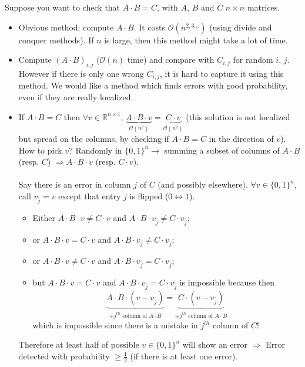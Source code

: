 \documentclass[11pt,a4paper]{scrartcl} %
\theoremstyle{definition}
\newcommand{\R}{\mathbb{R}}
\begin{document}
Suppose you want to check that $A\cdot B=C$, with $A$, $B$ and $C$ $n\times n$ matrices.
\begin{itemize}
	\item Obvious method: compute $A\cdot B$. It costs $\mathcal{O}(n^{2,3\hdots})$ (using divide and conquer methods). If $n$ is large, then this method might take a lot of time.
	\item Compute $\left( A\cdot B\right)_{i,j}$ ($\mathcal{O}(n)$ time) and compare with $C_{i,j}$ for random $i$, $j$. However if there is only one wrong $C_{i,j}$, it is hard to capture it using this method. We would like a method which finds errors with good probability, even if they are really localized.
	\item If $A\cdot B=C$ then $\forall v\in \R^{n\times 1}$, $\underbrace{A\cdot B\cdot v}_{\mathcal{O}(n^2)}=\underbrace{C\cdot v}_{\mathcal{O}(n^2)}$ (this solution is not localized but spread on the columns, by checking if $A\cdot B=C$ in the direction of $v$). How to pick $v$? Randomly in $\{0,1\}^n\rightarrow$ summing a subset of columns of $A\cdot B$ (resp. $C$) $\Rightarrow A\cdot B \cdot v$ (resp. $C\cdot v$).
	
	\paragraph{}
	
	Say there is an error in column $j$ of $C$ (and possibly elsewhere). $\forall v\in \{0,1\}^n$, call $v_{\bar{j}}=v$ except that entry $j$ is flipped ($0 \leftrightarrow 1$). 
	\begin{itemize}
		\item Either $A\cdot B\cdot v\neq C\cdot v$ and $A\cdot B\cdot v_{\bar{j}}\neq C\cdot v_{\bar{j}}$;
		\item or $A\cdot B\cdot v= C\cdot v$ and $A\cdot B\cdot v_{\bar{j}}\neq C\cdot v_{\bar{j}}$;
		\item or $A\cdot B\cdot v\neq C\cdot v$ and $A\cdot B\cdot v_{\bar{j}}= C\cdot v_{\bar{j}}$;
		\item but $A\cdot B\cdot v= C\cdot v$ and $A\cdot B\cdot v_{\bar{j}}= C\cdot v_{\bar{j}}$ is impossible because then 
		$$\underbrace{A\cdot B \cdot (v-v_{\bar{j}})}_{\pm j^{th} \text{ column of } A\cdot B}=\underbrace{C\cdot (v-v_{\bar{j}})}_{\pm j^{th} \text{ column of } A\cdot B}$$
		which is impossible since there is a mistake in $j^{th}$ column of $C$!
	\end{itemize}
	Therefore at least half of possible $v\in \{0,1\}^n$ will show an error $\Rightarrow$ Error detected with probability $\geq \frac{1}{2}$ (if there is at least one error).
	

\end{itemize}
\end{document}

